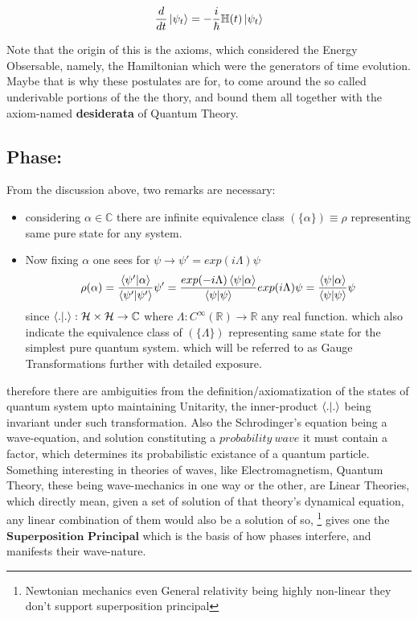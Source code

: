 \documentclass[8pt, twocoloumn]{article}
\begin{document}
\begin{equation}{\label{schro}}
 \frac{d}{dt}\ket{\psi_t}=-\frac{i}{\hbar}\mathbb{H}(t)\ket{\psi_t}
\end{equation}

Note that the origin of this is the axioms, which considered the Energy Obsersable, namely, the Hamiltonian which were the generators of time evolution. 
Maybe that is why these postulates are for, to come around the so called underivable portions of the the thory, and bound them all together with the axiom-named \textbf{desiderata} of Quantum Theory. 

\subsection{Phase:}


From the discussion above, two remarks are necessary:

\begin{itemize}
  \item considering $\alpha \in \mathbb{C}$ there are infinite equivalence class $(\{ \alpha\}) \equiv \rho$  representing same pure state for any system.
  \item Now fixing $\alpha$ one sees for $\psi \to \psi' = exp(i \Lambda)\psi$ $$\rho(\alpha) = \frac{\braket{\psi'|\alpha}}{\braket{\psi'|\psi'}}\psi' =  \frac{ exp(-i\Lambda)\braket{\psi|\alpha}}{\braket{\psi|\psi}}exp(i\Lambda)\psi = \frac{\braket{\psi|\alpha}}{\braket{\psi|\psi}}\psi $$ since $\braket{.|.}: \mathcal{H} \times \mathcal{H} \to \mathbb{C}$ where $\Lambda: C^{\infty}(\mathbb{R}) \to \mathbb{R} $ any real function. which also indicate the equivalence class of $(\{ \Lambda \})$ representing same state for the simplest pure quantum system. which will be referred to as Gauge Transformations further with detailed exposure.
\end{itemize}

therefore there are ambiguities from the definition/axiomatization of the states of quantum system upto maintaining Unitarity, the inner-product $\braket{.|.}$ being invariant under such transformation. Also the Schrodinger's equation being a wave-equation, and solution constituting a $probability \ wave$ it must contain a factor, which determines its probabilistic existance of a quantum particle. Something interesting in theories of waves, like Electromagnetism,  Quantum Theory, these being wave-mechanics in one way or the other, are Linear Theories, which directly mean, given a set of solution of that theory's dynamical equation, any linear combination of them would also be a solution of so, \footnote{Newtonian mechanics even General relativity being highly non-linear they don't support superposition principal} gives one the $\textbf{
Superposition Principal}$ which is the basis of how phases interfere, and manifests their wave-nature. 
\end{document}
